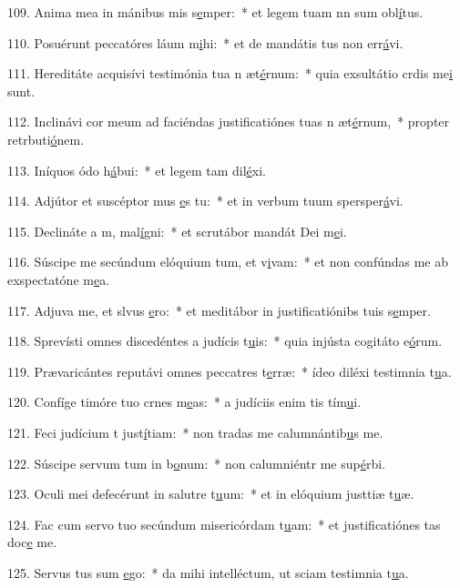 109. Anima mea in mánibus mis s\uline{e}mper:~* et legem tuam nn sum obl\uline{í}tus.\par 
110. Posuérunt peccatóres láum m\uline{i}hi:~* et de mandátis tus non err\uline{á}vi.\par 
111. Hereditáte acquisívi testimónia tua n æt\uline{é}rnum:~* quia exsultátio crdis me\uline{i} sunt.\par 
112. Inclinávi cor meum ad faciéndas justificatiónes tuas n æt\uline{é}rnum,~* propter retrbuti\uline{ó}nem.\par 
113. Iníquos ódo h\uline{á}bui:~* et legem tam dil\uline{é}xi.\par 
114. Adjútor et suscéptor mus \uline{e}s tu:~* et in verbum tuum spersper\uline{á}vi.\par 
115. Declináte a m, mal\uline{í}gni:~* et scrutábor mandát Dei m\uline{e}i.\par 
116. Súscipe me secúndum elóquium tum, et v\uline{i}vam:~* et non confúndas me ab exspectatóne m\uline{e}a.\par 
117. Adjuva me, et slvus \uline{e}ro:~* et meditábor in justificatiónibs tuis s\uline{e}mper.\par 
118. Sprevísti omnes discedéntes a judícis t\uline{u}is:~* quia injústa cogitáto e\uline{ó}rum.\par 
119. Prævaricántes reputávi omnes peccatres t\uline{e}rræ:~* ídeo diléxi testimnia t\uline{u}a.\par 
120. Confíge timóre tuo crnes m\uline{e}as:~* a judíciis enim tis tím\uline{u}i.\par 
121. Feci judícium t just\uline{í}tiam:~* non tradas me calumnántib\uline{u}s me.\par 
122. Súscipe servum tum in b\uline{o}num:~* non calumniéntr me sup\uline{é}rbi.\par 
123. Oculi mei defecérunt in salutre t\uline{u}um:~* et in elóquium justtiæ t\uline{u}æ.\par 
124. Fac cum servo tuo secúndum misericórdam t\uline{u}am:~* et justificatiónes tas doc\uline{e} me.\par 
125. Servus tus sum \uline{e}go:~* da mihi intelléctum, ut sciam testimnia t\uline{u}a.\par 
